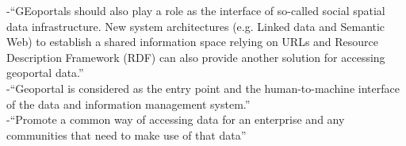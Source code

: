 -{\color{orange}“GEoportals should also play a role as the interface of so-called social spatial data infrastructure. New system architectures (e.g. Linked data and Semantic Web) to establish a shared information space relying on URLs and Resource Description Framework (RDF) can also provide another solution for accessing geoportal data.” \cite{Jiang2020}}\\
-{\color{orange}“Geoportal is considered as the entry point and the human-to-machine interface of the data and information management system.”\cite{Jiang2020}}\\
-{\color{orange}“Promote a common way of accessing data for an enterprise and any communities that need to make use of that data”\cite{Hintz2020}}\\

